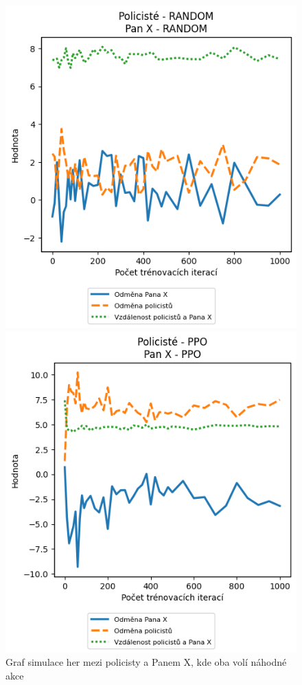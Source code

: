 \begin{figure}[H]
  \centering
  \begin{minipage}{.48\textwidth}
    \centering
    \includegraphics[width=1\textwidth]{obrazky-figures/graphs/cop_RANDOM_mrx_RANDOM}
    \caption{Graf simulace her mezi policisty a Panem X, kde oba volí náhodné akce}
    \label{fig:cop_random_mrx_random}
  \end{minipage}\hfill
  \begin{minipage}{.48\textwidth}
    \centering
    \includegraphics[width=1\textwidth]{obrazky-figures/graphs/cop_PPO_mrx_PPO}

\end{minipage}
\end{figure}
